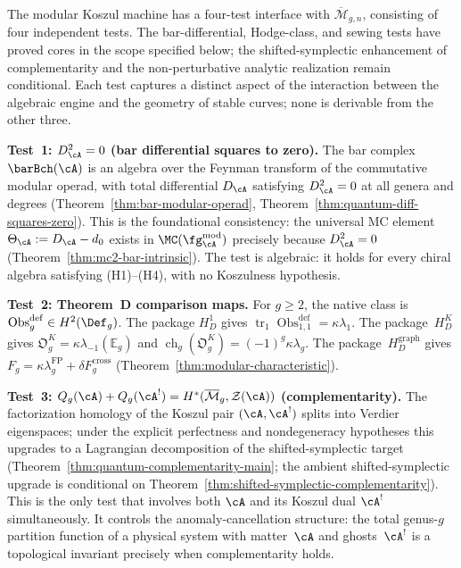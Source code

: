 \begin{remark}
\label{rem:four-test-interface}
\ClaimStatusConditional
{}
The modular Koszul machine has a four-test interface with
$\overline{\mathcal{M}}_{g,n}$, consisting of four
independent tests. The bar-differential, Hodge-class, and sewing
tests have proved cores in the scope specified below; the
shifted-symplectic enhancement of complementarity and the
non-perturbative analytic realization remain conditional. Each
test captures a distinct aspect of the
interaction between the algebraic engine and the geometry of
stable curves; none is derivable from the other three.

\smallskip
\noindent\textbf{Test~1: $D_\cA^2 = 0$ (bar differential squares to zero).}
The bar complex $\barBch(\cA)$ is an algebra over the Feynman
transform of the commutative modular operad, with total
differential $D_\cA$ satisfying $D_\cA^2 = 0$ at all genera and
degrees
(Theorem~\ref{thm:bar-modular-operad},
Theorem~\ref{thm:quantum-diff-squares-zero}).
This is the foundational consistency: the universal MC element
$\Theta_\cA := D_\cA - d_0$ exists in $\MC(\fg^{\mathrm{mod}}_\cA)$
precisely because $D_\cA^2 = 0$
(Theorem~\ref{thm:mc2-bar-intrinsic}).
The test is algebraic: it holds for every chiral algebra satisfying
(H1)--(H4), with no Koszulness hypothesis.

\smallskip
\noindent\textbf{Test~2: Theorem~D comparison maps.}
For $g\geq2$, the native class is
$\operatorname{Obs}^{\mathrm{def}}_g\in H^2(\Def_g)$.  The package
$H_D^1$ gives
$\operatorname{tr}_1\operatorname{Obs}^{\mathrm{def}}_{1,1}
=\kappa\lambda_1$.  The package~$H_D^K$ gives
$\mathfrak O_g^K=\kappa\lambda_{-1}(\mathbb E_g)$ and
$\operatorname{ch}_g(\mathfrak O_g^K)=(-1)^g\kappa\lambda_g$.
The package~$H_D^{\mathrm{graph}}$ gives
$F_g=\kappa\lambda_g^{\mathrm{FP}}+\delta F_g^{\mathrm{cross}}$
(Theorem~\ref{thm:modular-characteristic}).

\smallskip
\noindent\textbf{Test~3: $Q_g(\cA) + Q_g(\cA^!) =
H^*(\overline{\mathcal{M}}_g, \mathcal{Z}(\cA))$ (complementarity).}
The factorization homology of the Koszul pair $(\cA, \cA^!)$
splits into Verdier eigenspaces; under the explicit
perfectness and nondegeneracy hypotheses this upgrades to a
Lagrangian decomposition of the shifted-symplectic target
(Theorem~\ref{thm:quantum-complementarity-main};
the ambient shifted-symplectic upgrade is conditional on
Theorem~\ref{thm:shifted-symplectic-complementarity}).
This is the only test that involves both $\cA$ and its Koszul
dual $\cA^!$ simultaneously. It controls the anomaly-cancellation
structure: the total genus-$g$ partition function of a physical
system with matter~$\cA$ and ghosts~$\cA^!$ is a topological
invariant precisely when complementarity holds.


\end{remark}
